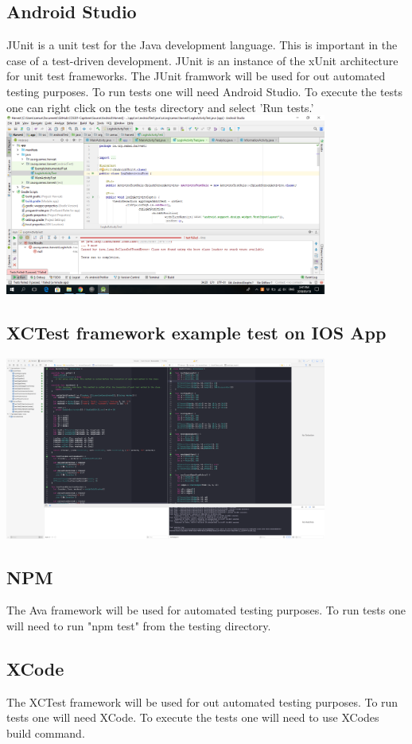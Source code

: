 \documentclass[12pt]{article}
\begin{document}
  \subsection{Android Studio}
JUnit is a unit test for the Java development language. This is important in the case of a test-driven development. JUnit is an instance of the xUnit architecture for unit test frameworks. The JUnit framwork will be used for out automated testing purposes. To run tests one will need Android Studio. To execute the tests one can right click on the tests directory and select 'Run tests.'\newline
\includegraphics[width=400px]{images/FailedLoginTest}
\subsection{ XCTest framework example test on IOS App}
\includegraphics[width=400px]{images/iostest}

  \subsection{NPM}
  The Ava framework will be used for automated testing purposes. To run tests one will need to run "npm test" from the testing directory.
  \subsection{XCode}
  The XCTest framework will be used for out automated testing purposes. To run tests one will need XCode. To execute the tests one will need to use XCodes build command.
\end{document}
